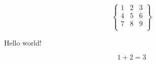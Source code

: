\documentclass[11pt,letterpaper]{article}
\begin{document}
    \[
        \begin{Bmatrix}
            1 & 2 & 3\\
            4 & 5 & 6\\
            7 & 8 & 9\\
        \end{Bmatrix}
    \]

    Hello world!


    \[
    1+2=3
    \]
\end{document}
